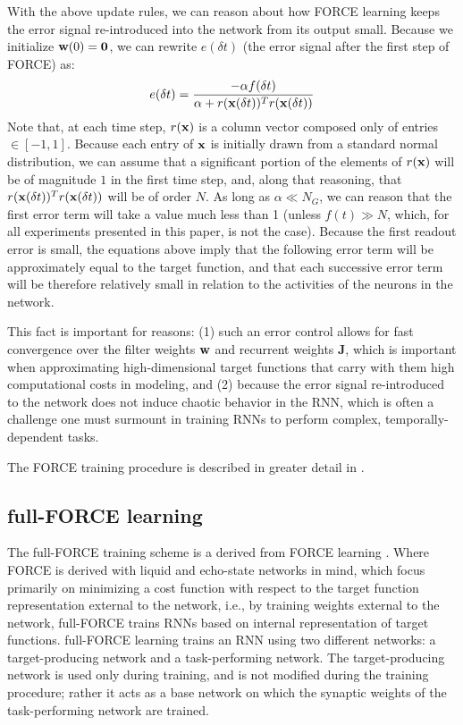 \documentclass[12pt,a4paper,final]{iopart}
\begin{document}
With the above update rules, we can reason about how FORCE learning keeps the error signal re-introduced into the network from its output small. Because we initialize ${\bf w}(0) = \boldsymbol{0}$, we can rewrite $e(\delta t)$ (the error signal after the first step of FORCE) as:
\[
    e(\delta t) = \frac{-\alpha f(\delta t)}{\alpha + r({\bf x}(\delta t))^T r({\bf x}(\delta t))}
\]
Note that, at each time step, $r({\bf x})$ is a column vector composed only of entries $\in [-1, 1]$. Because each entry of ${\bf x}$ is initially drawn from a standard normal distribution, we can assume that a significant portion of the elements of $r({\bf x})$ will be of magnitude $1$ in the first time step, and, along that reasoning, that $r({\bf x}(\delta t))^T r({\bf x}(\delta t))$ will be of order $N$. As long as $\alpha \ll N_G$, we can reason that the first error term will take a value much less than 1 (unless $f(t) \gg N$, which, for all experiments presented in this paper, is not the case). Because the first readout error is small, the equations above imply that the following error term will be approximately equal to the target function, and that each successive error term will be therefore relatively small in relation to the activities of the neurons in the network. 

This fact is important for reasons: (1) such an error control allows for fast convergence over the filter weights ${\bf w}$ and recurrent weights $\boldsymbol{J}$, which is important when approximating high-dimensional target functions that carry with them high computational costs in modeling, and (2) because the error signal re-introduced to the network does not induce chaotic behavior in the RNN, which is often a challenge one must surmount in training RNNs to perform complex, temporally-dependent tasks.

The FORCE training procedure is described in greater detail in \cite{Sussillo}.

\subsection{full-FORCE learning}
The full-FORCE training scheme is a derived from FORCE learning \cite{DePasquale}. Where FORCE is derived with liquid and echo-state networks in mind, which focus primarily on minimizing a cost function with respect to the target function representation external to the network, i.e., by training weights external to the network, full-FORCE trains RNNs based on internal representation of target functions. full-FORCE learning trains an RNN using two different networks: a target-producing network and a task-performing network. The target-producing network is used only during training, and is not modified during the training procedure; rather it acts as a base network on which the synaptic weights of the task-performing network are trained.
\end{document}
